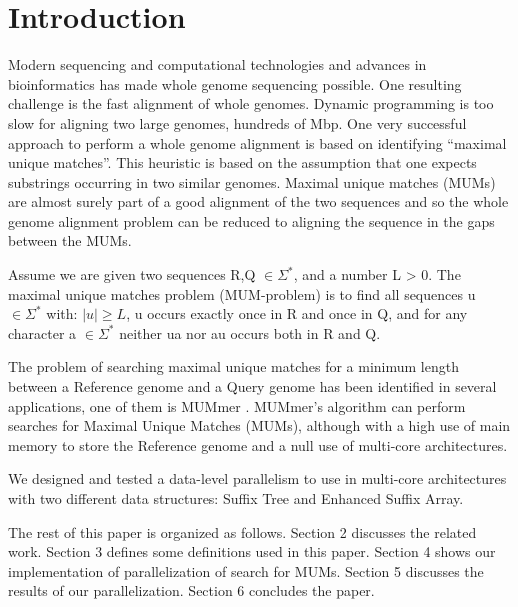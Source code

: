 \documentclass[runningheads,a4paper]{llncs}
\begin{document}
\section{Introduction} 
Modern sequencing and computational technologies and advances in bioinformatics has made whole genome sequencing possible. One resulting challenge is the fast alignment of whole genomes. Dynamic programming is too slow for aligning two large genomes, hundreds of Mbp. One very successful approach to perform a whole genome alignment is based on identifying ``maximal unique matches''. This heuristic is based on the assumption that one expects substrings occurring in two similar genomes. Maximal unique matches (MUMs) are almost surely part of a good alignment of the two sequences and so the whole genome alignment problem can be reduced to aligning the sequence in the gaps between the MUMs.
\begin{definition}
Assume we are given two sequences R,Q $\in \Sigma^*$, and a number L > 0. The maximal unique matches problem (MUM-problem) is to find all sequences u $\in \Sigma^*$ with: $|u|\geq L$, u occurs exactly once in R and once in Q, and for any character a $\in \Sigma^*$ neither ua nor au occurs both in R and Q.
\end{definition}
The problem of searching maximal unique matches for a minimum length between a Reference genome and a Query genome has been identified in several applications, one of them is MUMmer \cite{Delcher2003}. MUMmer's algorithm can perform searches for Maximal Unique Matches (MUMs), although with a high use of main memory to store the Reference genome and a null use of multi-core architectures.

We designed and tested a data-level parallelism to use in multi-core architectures with two different data structures: Suffix Tree and Enhanced Suffix Array.

The rest of this paper is organized as follows. Section 2 discusses the related work. Section 3 defines some definitions used in this paper. Section 4 shows our implementation of parallelization of search for MUMs. Section 5 discusses the results of our parallelization. Section 6 concludes the paper.
\end{document}
